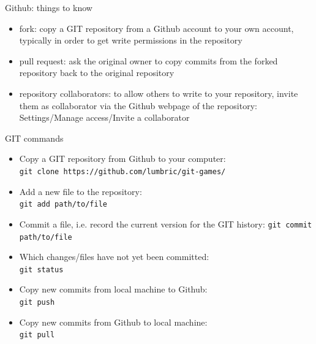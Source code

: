 \begin{frame}[fragile]{Github: things to know}
    \begin{itemize}
        \item fork: copy a GIT repository from a Github account to your own account, typically in
            order to get write permissions in the repository
        \item pull request: ask the original owner to copy commits from the forked repository
            back to the original repository
        \item repository collaborators: to allow others to write to your repository,
            invite them as collaborator via the Github webpage of the repository:\\
            Settings/Manage access/Invite a collaborator
    \end{itemize}
\end{frame}


\begin{frame}[fragile]{GIT commands}
    \begin{itemize}
        \item Copy a GIT repository from Github to your computer:\\
            \verb|git clone https://github.com/lumbric/git-games/|
        \item Add a new file to the repository:\\
            \verb|git add path/to/file|
        \item Commit a file, i.e. record the current version for the GIT history:
            \verb|git commit path/to/file|
        \item Which changes/files have not yet been committed:\\
            \verb|git status|
        \item Copy new commits from local machine to Github:\\
            \verb|git push|
        \item Copy new commits from Github to local machine:\\
            \verb|git pull|
    \end{itemize}
\end{frame}




